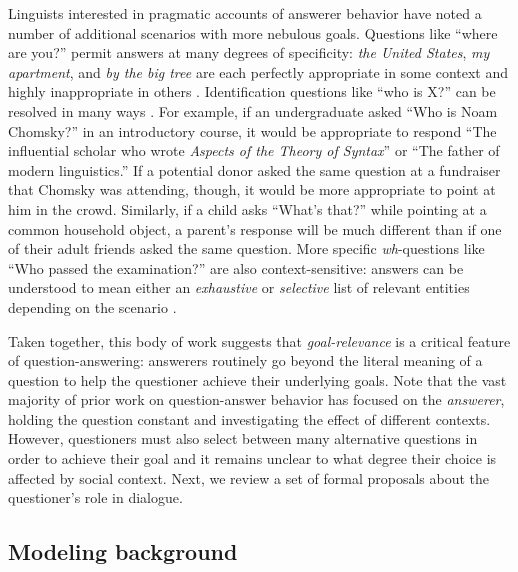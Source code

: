 \documentclass[12pt, floatsintext, jou]{apa6}
\begin{document}
Linguists interested in pragmatic accounts of answerer behavior have noted a number of additional scenarios with more nebulous goals. 
Questions like ``where are you?'' permit answers at many degrees of specificity: \emph{the United States}, \emph{my apartment}, and \emph{by the big tree} are each perfectly appropriate in some context and highly inappropriate in others \cite{Potts12_CardsDialogueCorpus}. 
Identification questions like ``who is X?'' can be resolved in many ways  \cite{BoerLycan75_KnowingWho, Gerbrandy00_Identity, Aloni05_ConceptualCovers}. 
For example, if an undergraduate asked ``Who is Noam Chomsky?'' in an introductory course, it would be appropriate to respond ``The influential scholar who wrote \emph{Aspects of the Theory of Syntax}'' or ``The father of modern linguistics.'' 
If a potential donor asked the same question at a fundraiser that Chomsky was attending, though, it would be more appropriate to point at him in the crowd. 
Similarly, if a child asks ``What's that?'' while pointing at a common household object, a parent's response will be much different than if one of their adult friends asked the same question. 
More specific \emph{wh}-questions like ``Who passed the examination?'' are also context-sensitive: answers can be understood to mean either an \emph{exhaustive} or \emph{selective} list of relevant entities depending on the scenario \cite{SchulzVanRooij06_ExhaustiveInterpretation}.

Taken together, this body of work suggests that \emph{goal-relevance} is a critical feature of question-answering: answerers routinely go beyond the literal meaning of a question to help the questioner achieve their underlying goals. Note that the vast majority of prior work on question-answer behavior has focused on the \emph{answerer}, holding the question constant and investigating the effect of different contexts. 
However, questioners must also select between many alternative questions in order to achieve their goal and it remains unclear to what degree their choice is affected by social context. Next, we review a set of formal proposals about the questioner's role in dialogue.  

\subsection{Modeling background}
\end{document}
